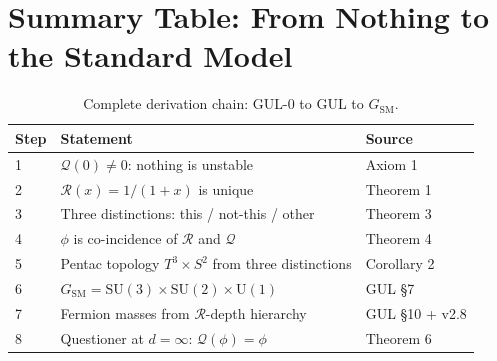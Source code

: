 \documentclass[11pt]{article}
\begin{document}
\section{Summary Table: From Nothing to the Standard Model}
\label{app:summary}

\begin{table}[htbp]
\centering
\caption{Complete derivation chain: GUL-0 to GUL to $G_{\mathrm{SM}}$.}
\begin{tabular}{@{}lll@{}}
\toprule
Step & Statement & Source \\
\midrule
1 & $\mathcal{Q}(0)\neq 0$: nothing is unstable          & Axiom 1 \\
2 & $\mathcal{R}(x)=1/(1+x)$ is unique                   & Theorem 1 \\
3 & Three distinctions: this / not-this / other           & Theorem 3 \\
4 & $\phi$ is co-incidence of $\mathcal{R}$ and $\mathcal{Q}$ & Theorem 4 \\
5 & Pentac topology $T^3\times S^2$ from three distinctions & Corollary 2 \\
6 & $G_{\mathrm{SM}}=\mathrm{SU}(3)\times\mathrm{SU}(2)\times\mathrm{U}(1)$ & GUL \S7 \\
7 & Fermion masses from $\mathcal{R}$-depth hierarchy     & GUL \S10 + v2.8 \\
8 & Questioner at $d=\infty$: $\mathcal{Q}(\phi)=\phi$   & Theorem 6 \\
\bottomrule
\end{tabular}
\end{table}
\end{document}
